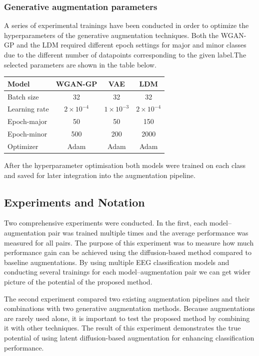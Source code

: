 \newpage

\subsubsection{Generative augmentation parameters}

A series of experimental trainings have been conducted in order to optimize  the hyperparameters of the generative augmentation techniques. Both the WGAN-GP and the LDM required different epoch settings for major and minor classes due to the different number of datapoints corresponding to the given label.The selected parameters are shown in the table below.

\begin{table}[H]
\centering
\begin{tabular*}{\textwidth}{@{\extracolsep{\fill}}lccc}
\toprule
\textbf{Model} & \textbf{WGAN-GP} & \textbf{VAE} & \textbf{LDM} \\
\midrule
Batch size     & 32     & 32     & 32 \\
Learning rate  & $2\times10^{-4}$ & $1\times10^{-3}$ & $2\times10^{-4}$ \\
Epoch-major    & 50     & 50     & 150 \\
Epoch-minor    & 500    & 200    & 2000 \\
Optimizer      & Adam   & Adam   & Adam \\
\bottomrule
\end{tabular*}
\end{table}

After the hyperparameter optimisation both models were trained on each class and saved for later integration into the augmentation pipeline.

\subsection{Experiments and Notation}

Two comprehensive experiments were conducted. In the first, each model–augmentation pair was trained multiple times and the average performance was measured for all pairs. The purpose of this experiment was to measure how much performance gain can be achieved using the diffusion-based method compared to baseline augmentations. By using multiple EEG classification models and conducting several trainings for each model–augmentation pair we can get wider picture of the potential of the proposed method.

The second experiment compared two existing augmentation pipelines and their combinations with two generative augmentation methods. Because augmentations are rarely used alone, it is important to test the proposed method by combining it with other techniques. The result of this experiment demonstrates the true potential of using latent diffusion-based augmentation for enhancing classification performance.

